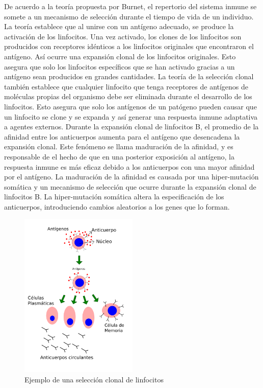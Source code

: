De acuerdo a la teoría propuesta por Burnet, el repertorio del sistema inmune se somete a un mecanismo de selección durante el tiempo de vida de un individuo.
La teoría establece que al unirse con un antígeno adecuado, se produce la activación de los linfocitos.
Una vez activado, los clones de los linfocitos son producidos con receptores idénticos a los linfocitos originales que encontraron el antígeno.
Así ocurre una expansión clonal de los linfocitos originales.
Esto asegura que solo los linfocitos específicos que se han activado gracias a un antígeno sean producidos en grandes cantidades.
La teoría de la selección clonal también establece que cualquier linfocito que tenga receptores de antígenos de moléculas propias del organismo
debe ser eliminada durante el desarrollo de los linfocitos.
Esto asegura que solo los antígenos de un patógeno pueden causar que un linfocito se clone y se expanda y así generar una respuesta inmune adaptativa a
agentes externos.
Durante la expansión clonal de linfocitos B, el promedio de la afinidad entre los anticuerpos aumenta para el antígeno que desencadena la expansión clonal.
Este fenómeno se llama maduración de la afinidad, y es responsable de el hecho de que en una posterior exposición al antígeno, la respuesta inmune es más eficaz debido a los anticuerpos con una mayor afinidad por el antígeno.
La maduración de la afinidad es causada por una hiper-mutación somática y un mecanismo de selección que ocurre durante la expansión clonal de linfocitos B.
La hiper-mutación somática altera la especificación de los anticuerpos, introduciendo cambios aleatorios a los genes que lo forman.
\begin{figure}[h!]
\begin{center}
\includegraphics[width=0.5\textwidth]{img/clonalSelection.pdf}
\end{center}
\caption{Ejemplo de una selección clonal de linfocitos}
\label{fig:clonalSelection}
\end{figure}


